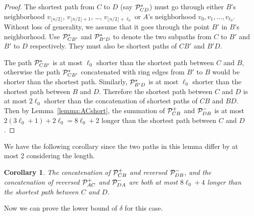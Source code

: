 \documentclass[11pt]{article}
\newtheorem{coro}[lem]{Corollary}
\begin{document}
\begin{proof}
The shortest path from $C$ to $D$ (say ${\cal P}_{CD}^*$) must go through either $B$'s neighborhood $v_{\lfloor n/2\rfloor}$, $v_{\lfloor n/2\rfloor+1}$, \ldots, $v_{\lfloor n/2\rfloor+\ell_0}$ or $A$'s neighborhood $v_0,v_1,\ldots,v_{\ell_0}$. Without loss of generality, we assume that it goes through the point $B'$ in $B$'s neighborhood. Use ${\cal P}_{CB'}^*$ and ${\cal P}_{B'D}^*$ to denote the two subpaths from $C$ to $B'$ and $B'$ to $D$ respectively. They must also be shortest paths of $CB'$ and $B'D$.

The path ${\cal P}_{CB'}^*$ is at most $\ell_0$ shorter than the shortest path between $C$ and $B$, otherwise the path ${\cal P}_{CB'}^*$ concatenated with ring edges from $B'$ to $B$ would be shorter than the shortest path. Similarly, ${\cal P}_{B'D}^*$ is at most $\ell_0$ shorter than the shortest path between $B$ and $D$. Therefore the shortest path between $C$ and $D$ is at most $2\ell_0$ shorter than the concatenation of shortest paths of $CB$ and $BD$. Then by Lemma~\ref{lemma:ACshort}, the summation of ${\cal P}_{CB}^+$ and ${\cal P}_{DB}^-$ is at most $2(3\ell_0+1)+2\ell_0=8\ell_0+2$ longer than the shortest path between $C$ and $D$.
\end{proof}

We have the following corollary since the two paths in this lemma differ by at most 2 considering the length.

\begin{coro} \label{cor:CDshort}
The concatenation of ${\cal P}_{CB}^+$ and reversed ${\cal P}_{DB}^-$, and the concatenation of reversed ${\cal P}_{AC}^+$ and ${\cal P}_{DA}^-$ are both at most $8\ell_0+4$ longer than the shortest path between $C$ and $D$.
\end{coro}

Now we can prove the lower bound of $\delta$ for this case.
\end{document}
